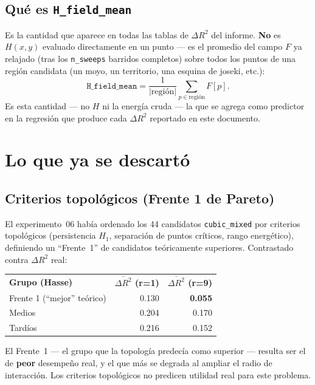 \documentclass[11pt, a4paper]{article}
\newcommand{\TH}[1]{\cellcolor{cTHbg}\color{white}\textbf{#1}}
\newcommand{\bad}[1]{\color{cBad}\textbf{#1}}
\begin{document}
\subsection{Qu\'e es \texttt{H\_field\_mean}}

Es la cantidad que aparece en todas las tablas de $\Delta R^2$ del
informe. \textbf{No} es $H(x,y)$ evaluado directamente en un punto ---
es el promedio del campo $F$ ya relajado (tras los \texttt{n\_sweeps}
barridos completos) sobre todos los puntos de una regi\'on candidata
(un moyo, un territorio, una esquina de joseki, etc.):
\[
\texttt{H\_field\_mean} = \frac{1}{|\text{regi\'on}|}\sum_{p\in\text{regi\'on}} F[p].
\]
Es esta cantidad --- no $H$ ni la energ\'ia cruda --- la que se agrega
como predictor en la regresi\'on que produce cada $\Delta R^2$
reportado en este documento.

\section{Lo que ya se descart\'o}

\subsection{Criterios topol\'ogicos (Frente 1 de Pareto)}

El experimento~06 hab\'ia ordenado los 44 candidatos \texttt{cubic\_mixed}
por criterios topol\'ogicos (persistencia $H_1$, separaci\'on de puntos
cr\'iticos, rango energ\'etico), definiendo un ``Frente~1'' de candidatos
te\'oricamente superiores. Contrastado contra $\Delta R^2$ real:

\medskip
\begin{center}
\begin{tabular}{lrr}
  \TH{Grupo (Hasse)} & \TH{$\overline{\Delta R^2}$ (r=1)} & \TH{$\overline{\Delta R^2}$ (r=9)} \\[1pt]
  Frente 1 (``mejor'' te\'orico) & 0.130 & \bad{0.055} \\
  Medios                          & 0.204 & 0.170 \\
  Tard\'ios                       & 0.216 & 0.152 \\
\end{tabular}
\end{center}
\medskip

El Frente~1 --- el grupo que la topolog\'ia predec\'ia como superior ---
resulta ser el de \textbf{peor} desempe\~no real, y el que m\'as se
degrada al ampliar el radio de interacci\'on. Los criterios topol\'ogicos
no predicen utilidad real para este problema.
\end{document}
